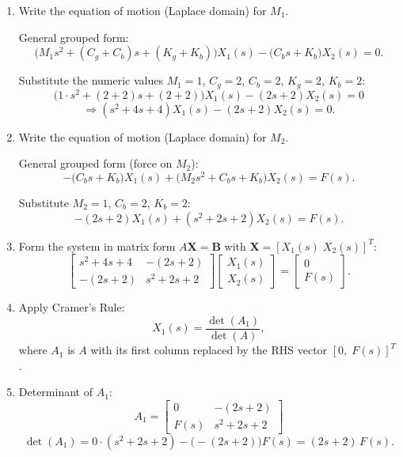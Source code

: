 \documentclass[11pt]{article}
\begin{document}
\begin{enumerate}[label=(\alph*), itemindent=*, leftmargin=*, nolistsep]

    \item Write the equation of motion (Laplace domain) for $M_1$.

    General grouped form:
    \[
    \big(M_1 s^2 + (C_g+C_b)s + (K_g+K_b)\big)X_1(s)
    - \big(C_b s + K_b\big)X_2(s) = 0.
    \]

    Substitute the numeric values $M_1=1$, $C_g=2$, $C_b=2$, $K_g=2$, $K_b=2$:
    \[
    \big(1\cdot s^2 + (2+2)s + (2+2)\big)X_1(s) - (2s + 2)X_2(s) = 0
    \]
    \[
    \Rightarrow (s^2 + 4s + 4)X_1(s) - (2s+2)X_2(s) = 0.
    \]

    \item Write the equation of motion (Laplace domain) for $M_2$.

    General grouped form (force on $M_2$):
    \[
    -\big(C_b s + K_b\big)X_1(s) + \big(M_2 s^2 + C_b s + K_b\big)X_2(s) = F(s).
    \]

    Substitute $M_2=1$, $C_b=2$, $K_b=2$:
    \[
    -(2s+2)X_1(s) + (s^2 + 2s + 2)X_2(s) = F(s).
    \]

    \item Form the system in matrix form \(A\mathbf{X}=\mathbf{B}\) with \(\mathbf{X}=[X_1(s)\; X_2(s)]^T\):
    \[
    \begin{bmatrix}
    s^2 + 4s + 4 & -(2s + 2) \\[6pt]
    -(2s + 2) & s^2 + 2s + 2
    \end{bmatrix}
    \begin{bmatrix}
    X_1(s) \\[4pt] X_2(s)
    \end{bmatrix}
    =
    \begin{bmatrix}
    0 \\[4pt] F(s)
    \end{bmatrix}.
    \]

    \item Apply Cramer's Rule:
    \[
    X_1(s) = \frac{\det(A_1)}{\det(A)},
    \]
    where $A_1$ is $A$ with its first column replaced by the RHS vector $[0,\;F(s)]^T$.

    \item Determinant of $A_1$:
    \[
    A_1 =
    \begin{bmatrix}
    0 & -(2s+2) \\
    F(s) & s^2 + 2s + 2
    \end{bmatrix}
    \]
    \[
    \det(A_1) = 0\cdot(s^2+2s+2) - \big(-(2s+2)\big)F(s) = (2s+2)\,F(s).
    \]


\end{enumerate}
\end{document}
